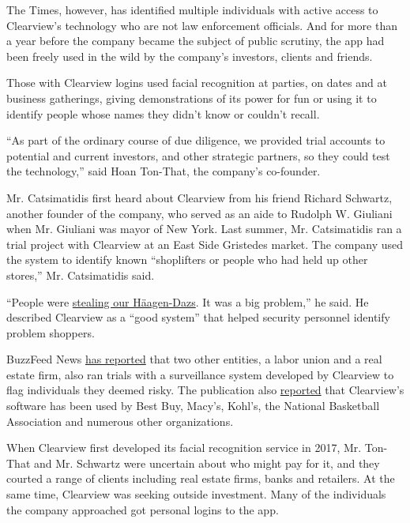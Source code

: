 The Times, however, has identified multiple individuals with active
access to Clearview's technology who are not law enforcement officials.
And for more than a year before the company became the subject of public
scrutiny, the app had been freely used in the wild by the company's
investors, clients and friends.

Those with Clearview logins used facial recognition at parties, on dates
and at business gatherings, giving demonstrations of its power for fun
or using it to identify people whose names they didn't know or couldn't
recall.

``As part of the ordinary course of due diligence, we provided trial
accounts to potential and current investors, and other strategic
partners, so they could test the technology,'' said Hoan Ton-That, the
company's co-founder.

Mr. Catsimatidis first heard about Clearview from his friend Richard
Schwartz, another founder of the company, who served as an aide to
Rudolph W. Giuliani when Mr. Giuliani was mayor of New York. Last
summer, Mr. Catsimatidis ran a trial project with Clearview at an East
Side Gristedes market. The company used the system to identify known
``shoplifters or people who had held up other stores,'' Mr. Catsimatidis
said.

``People were
\href{https://nypost.com/2016/08/12/ice-cream-bandits-are-wreaking-havoc-on-nyc-supermarkets/}{stealing
our Häagen-Dazs}. It was a big problem,'' he said. He described
Clearview as a ``good system'' that helped security personnel identify
problem shoppers.

BuzzFeed News
\href{https://www.buzzfeednews.com/article/carolinehaskins1/clearview-facial-recognition-insight-camera-glasses}{has
reported} that two other entities, a labor union and a real estate firm,
also ran trials with a surveillance system developed by Clearview to
flag individuals they deemed risky. The publication also
\href{https://www.buzzfeednews.com/article/ryanmac/clearview-ai-fbi-ice-global-law-enforcement}{reported}
that Clearview's software has been used by Best Buy, Macy's, Kohl's, the
National Basketball Association and numerous other organizations.

When Clearview first developed its facial recognition service in 2017,
Mr. Ton-That and Mr. Schwartz were uncertain about who might pay for it,
and they courted a range of clients including real estate firms, banks
and retailers. At the same time, Clearview was seeking outside
investment. Many of the individuals the company approached got personal
logins to the app.

